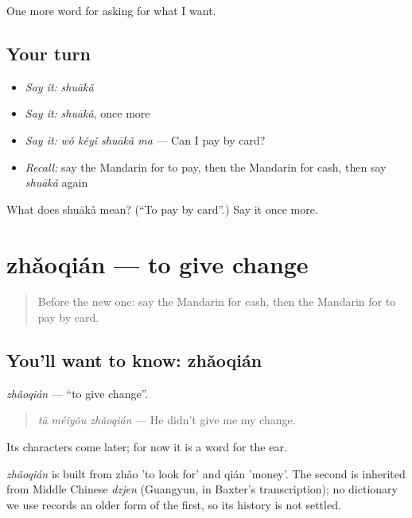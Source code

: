 \begin{grammarlens}[title={What you've built}]
One more word for asking for what I want.
\end{grammarlens}

\subsection*{Your turn}
\begin{itemize}
\raggedright
  \item \emph{Say it:} \emph{shuākǎ}
  \item \emph{Say it:} \emph{shuākǎ}, once more
  \item \emph{Say it:} \emph{wǒ kěyǐ shuākǎ ma} — Can I pay by card?
  \item \emph{Recall:} say the Mandarin for to pay, then the Mandarin for cash, then say \emph{shuākǎ} again
\end{itemize}

\begin{tcolorbox}[breakable,colback=teal!4,colframe=teal!35!black,title={Before you move on}]
What does shuākǎ mean? (\textquotedblleft{}To pay by card\textquotedblright{}.) Say it once more.
\end{tcolorbox}
\section[zhǎoqián]{zhǎoqián — to give change}

\label{lesson:ZH-C114-zhaoqian}



\begin{quote}
Before the new one: say the Mandarin for cash, then the Mandarin for to pay by card.
\end{quote}

\subsection*{You'll want to know: zhǎoqián}
\emph{zhǎoqián} — \textquotedblleft{}to give change\textquotedblright{}.

\begin{quote}
\emph{tā méiyǒu zhǎoqián} — He didn't give me my change.
\end{quote}

Its characters come later; for now it is a word for the ear.

\begin{cousinweb}
\emph{zhǎoqián} is built from zhǎo 'to look for' and qián 'money'. The second is inherited from Middle Chinese \emph{dzjen} (Guangyun, in Baxter's transcription); no dictionary we use records an older form of the first, so its history is not settled.
\end{cousinweb}

